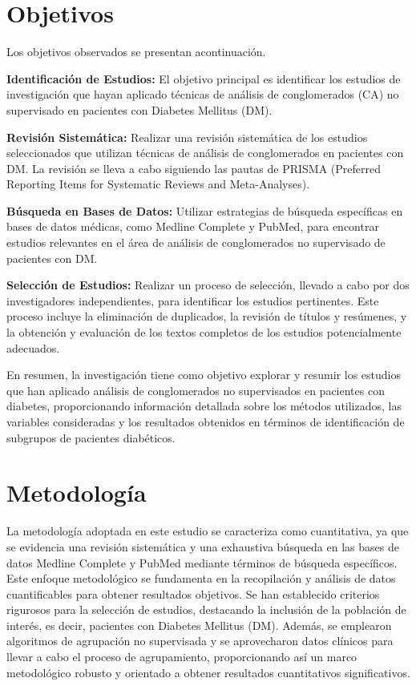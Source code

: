\documentclass[12pt]{article}
\begin{document}
\section{Objetivos}
Los objetivos observados se presentan acontinuación.

\textbf{Identificación de Estudios:} El objetivo principal es identificar los estudios de investigación que hayan aplicado técnicas de análisis de conglomerados (CA) no supervisado en pacientes con Diabetes Mellitus (DM).

\textbf{Revisión Sistemática:} Realizar una revisión sistemática de los estudios seleccionados que utilizan técnicas de análisis de conglomerados en pacientes con DM. La revisión se lleva a cabo siguiendo las pautas de PRISMA (Preferred Reporting Items for Systematic Reviews and Meta-Analyses).

\textbf{Búsqueda en Bases de Datos:} Utilizar estrategias de búsqueda específicas en bases de datos médicas, como Medline Complete y PubMed, para encontrar estudios relevantes en el área de análisis de conglomerados no supervisado de pacientes con DM.

\textbf{Selección de Estudios:} Realizar un proceso de selección, llevado a cabo por dos investigadores independientes, para identificar los estudios pertinentes. Este proceso incluye la eliminación de duplicados, la revisión de títulos y resúmenes, y la obtención y evaluación de los textos completos de los estudios potencialmente adecuados.

En resumen, la investigación tiene como objetivo explorar y resumir los estudios que han aplicado análisis de conglomerados no supervisados en pacientes con diabetes, proporcionando información detallada sobre los métodos utilizados, las variables consideradas y los resultados obtenidos en términos de identificación de subgrupos de pacientes diabéticos.

\section{Metodología}
La metodología adoptada en este estudio se caracteriza como cuantitativa, ya que se evidencia una revisión sistemática y una exhaustiva búsqueda en las bases de datos Medline Complete y PubMed mediante términos de búsqueda específicos. Este enfoque metodológico se fundamenta en la recopilación y análisis de datos cuantificables para obtener resultados objetivos. Se han establecido criterios rigurosos para la selección de estudios, destacando la inclusión de la población de interés, es decir, pacientes con Diabetes Mellitus (DM). Además, se emplearon algoritmos de agrupación no supervisada y se aprovecharon datos clínicos para llevar a cabo el proceso de agrupamiento, proporcionando así un marco metodológico robusto y orientado a obtener resultados cuantitativos significativos.
\end{document}
